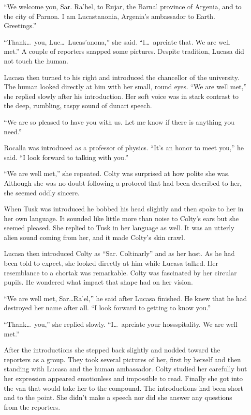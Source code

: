``We welcome you, Sar. Ra'hel, to Rujar, the Barnal province of Argenia, and to the city of
Parnon. I am Lucastanonia, Argenia's ambassador to Earth. Greetings.''

``Thank\ldots\ you, Luc\ldots\ Lucas'anona,'' she said. ``I\ldots\ apreiate that. We are well
met.'' A couple of reporters snapped some pictures. Despite tradition, Lucasa did not touch the
human.

Lucasa then turned to his right and introduced the chancellor of the university. The human
looked directly at him with her small, round eyes. ``We are well met,'' she replied slowly after
his introduction. Her soft voice was in stark contrast to the deep, rumbling, raspy sound of
dunari speech.

``We are so pleased to have you with us. Let me know if there is anything you need.''

Rocalla was introduced as a professor of physics. ``It's an honor to meet you,'' he said. ``I
look forward to talking with you.''

``We are well met,'' she repeated. Colty was surprised at how polite she was. Although she was
no doubt following a protocol that had been described to her, she seemed oddly sincere.

When Tusk was introduced he bobbed his head slightly and then spoke to her in her own language.
It sounded like little more than noise to Colty's ears but she seemed pleased. She replied to
Tusk in her language as well. It was an utterly alien sound coming from her, and it made Colty's
skin crawl.

Lucasa then introduced Colty as ``Sar. Coltinarly'' and as her host. As he had been told to
expect, she looked directly at him while Lucasa talked. Her resemblance to a chortak was
remarkable. Colty was fascinated by her circular pupils. He wondered what impact that shape had
on her vision.

``We are well met, Sar\ldots Ra'el,'' he said after Lucasa finished. He knew that he had
destroyed her name after all. ``I look forward to getting to know you.''

``Thank\ldots\ you,'' she replied slowly. ``I\ldots\ apreiate your hossspitality. We are well
met.''

After the introductions she stepped back slightly and nodded toward the reporters as a group.
They took several pictures of her, first by herself and then standing with Lucasa and the human
ambassador. Colty studied her carefully but her expression appeared emotionless and impossible
to read. Finally she got into the van that would take her to the compound. The introductions had
been short and to the point. She didn't make a speech nor did she answer any questions from the
reporters.


